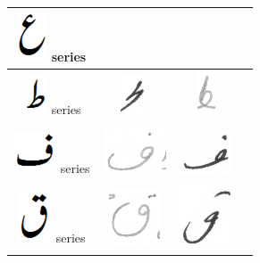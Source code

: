 \documentclass[a4paper,conference]{IEEEtran}
\begin{document}
\begin{table}[h]
\begin{tabular}{@{}cccc@{}}
\hline
\includegraphics[scale=0.15]{aien_orig} series & 
& &  \\
\hline
\includegraphics[scale=0.15]{tuay_orig} series & \includegraphics[scale=0.15]{98} & \includegraphics[scale=0.15]{99}  &  \\
\hline
\includegraphics[scale=0.25]{fay_orig} series & \includegraphics[scale=0.25]{100} & \includegraphics[scale=0.25]{101}  &  \\
\hline
\includegraphics[scale=0.20]{qaaf_orig} series & \includegraphics[scale=0.15]{102} & 
\includegraphics[scale=0.15]{103} & \\

\end{tabular}
\end{table}
\end{document}
